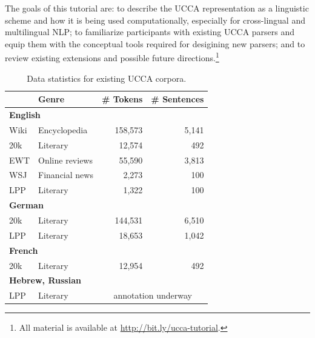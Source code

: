 \documentclass[11pt,a4paper,table]{article}
\begin{document}
The goals of this tutorial are:
to describe the UCCA representation as a linguistic scheme and how it is
being used computationally, especially for cross-lingual and multilingual
NLP; to familiarize participants with existing UCCA parsers and
equip them with the conceptual tools required for desigining new parsers;
and to review existing extensions and possible future directions.\footnote{All material is available at \url{http://bit.ly/ucca-tutorial}.}

\begin{table}[t]
\centering\setlength{\tabcolsep}{3.5pt}
\begin{tabular}{ll|rr}
& \bf Genre & \bf \# Tokens & \bf \# Sentences \\
\hline
\multicolumn{2}{l|}{\bf English} \\
Wiki & Encyclopedia & 158,573 & 5,141 \\
20k & Literary & 12,574 & 492 \\
EWT & Online reviews & 55,590 & 3,813 \\
WSJ & Financial news & 2,273 & 100 \\
LPP & Literary & 1,322 & 100 \\\hline
\multicolumn{2}{l|}{\bf German} \\
20k & Literary & 144,531 & 6,510 \\
LPP & Literary & 18,653 & 1,042 \\\hline
\multicolumn{2}{l|}{\bf French} \\
20k & Literary & 12,954 & 492 \\\hline
\multicolumn{2}{l|}{\bf Hebrew, Russian} \\
LPP & Literary & \multicolumn{2}{c}{annotation underway}\\\hline
\end{tabular}
\caption{Data statistics for existing UCCA corpora.\label{tab:data}}
\end{table}
\end{document}
